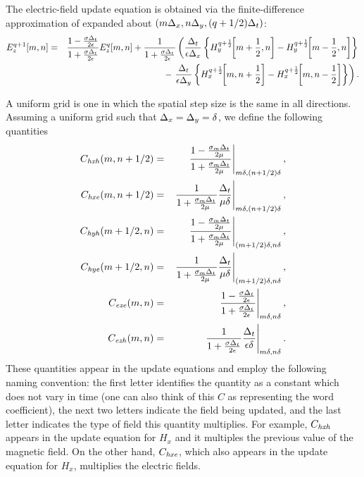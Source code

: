 The electric-field update equation is obtained via the finite-difference
approximation of  expanded about
$(m\Delta_x,n\Delta_y,(q+1/2)\Delta_t)$:
\begin{eqnarray}
  \fdtd{E_z}{m,n}{q+1} &=&
  \frac{1-\frac{\sigma\Delt}{2\epsilon}}{1+\frac{\sigma\Delt}{2\epsilon}}
  \fdtd{E_z}{m,n}{q} + 
  \frac{1}{1+\frac{\sigma\Delt}{2\epsilon}}
  \left(
    \frac{\Delt}{\epsilon\Delx}
    \left\{
      \fdtdh{H_y}{m+\half,n}{q+\half} - \fdtdh{H_y}{m-\half,n}{q+\half}
    \right\}\right.
 \nonumber\\
  && \hspace{1.2in} \mbox{} - 
	\left.
    \frac{\Delt}{\epsilon\Dely}
    \left\{
      \fdtdh{H_x}{m,n+\half}{q+\half} - \fdtdh{H_x}{m,n-\half}{q+\half}
    \right\}
  \right).
\end{eqnarray}

A uniform grid is one in which the spatial step size is the same in
all directions.  Assuming a uniform grid such that
$\Delta_x=\Delta_y=\delta$, we define the following quantities
\begin{eqnarray}
C_{\mathit{hxh}}(m,n+1/2) &=&
  \left.
    \frac{1-\frac{\sigma_m\Delta_t}{2\mu}}{1+\frac{\sigma_m\Delta_t}{2\mu}}
  \right|_{m\delta,(n+1/2)\delta}, \\
C_{\mathit{hxe}}(m,n+1/2) &=&
  \left.
    \frac{1}{1+\frac{\sigma_m\Delta_t}{2\mu}}\frac{\Delta_t}{\mu\delta}
  \right|_{m\delta,(n+1/2)\delta}, \\
C_{\mathit{hyh}}(m+1/2,n) &=&
  \left.
    \frac{1-\frac{\sigma_m\Delta_t}{2\mu}}{1+\frac{\sigma_m\Delta_t}{2\mu}}
  \right|_{(m+1/2)\delta,n\delta}, \\
C_{\mathit{hye}}(m+1/2,n) &=&
  \left.
    \frac{1}{1+\frac{\sigma_m\Delta_t}{2\mu}}\frac{\Delta_t}{\mu\delta}
  \right|_{(m+1/2)\delta,n\delta}, \\
C_{\mathit{eze}}(m,n) &=& 
  \left.
  \frac{1-\frac{\sigma\Delta_t}{2\epsilon}}{1+\frac{\sigma\Delta_t}{2\epsilon}}
  \right|_{m\delta,n\delta}, \\
C_{\mathit{ezh}}(m,n) &=& 
  \left.
  \frac{1}{1+\frac{\sigma\Delta_t}{2\epsilon}}
    \frac{\Delta_t}{\epsilon\delta}
  \right|_{m\delta,n\delta}.
\end{eqnarray}
These quantities appear in the update equations and employ the
following naming convention: the first letter identifies the quantity
as a constant which does not vary in time (one can also think of this
$C$ as representing the word coefficient), the next two letters
indicate the field being updated, and the last letter indicates the
type of field this quantity multiplies.  For example, $C_{\mathit{hxh}}$
appears in the update equation for $H_x$ and it multiples the previous
value of the magnetic field.  On the other hand, $C_{\mathit{hxe}}$, which
also appears in the update equation for $H_x$, multiplies the electric
fields.

